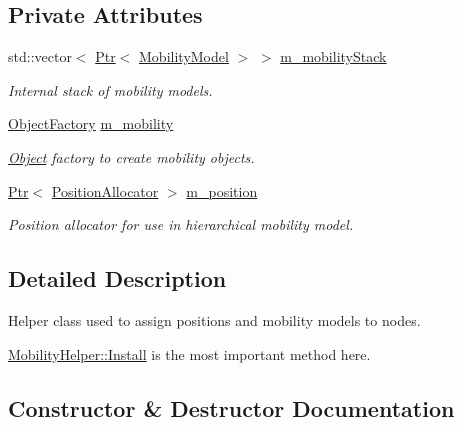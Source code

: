 \subsection*{Private Attributes}
\begin{DoxyCompactItemize}
\item 
std\+::vector$<$ \hyperlink{classns3_1_1Ptr}{Ptr}$<$ \hyperlink{classns3_1_1MobilityModel}{Mobility\+Model} $>$ $>$ \hyperlink{classns3_1_1MobilityHelper_afa6de1206985c5c37610f02de43b10d2}{m\+\_\+mobility\+Stack}
\begin{DoxyCompactList}\small\item\em Internal stack of mobility models. \end{DoxyCompactList}\item 
\hyperlink{classns3_1_1ObjectFactory}{Object\+Factory} \hyperlink{classns3_1_1MobilityHelper_a4ef940485a2e5b840d1552bc5331c404}{m\+\_\+mobility}
\begin{DoxyCompactList}\small\item\em \hyperlink{classns3_1_1Object}{Object} factory to create mobility objects. \end{DoxyCompactList}\item 
\hyperlink{classns3_1_1Ptr}{Ptr}$<$ \hyperlink{classns3_1_1PositionAllocator}{Position\+Allocator} $>$ \hyperlink{classns3_1_1MobilityHelper_a93a974a210f2c818b2649fca2d24d264}{m\+\_\+position}
\begin{DoxyCompactList}\small\item\em Position allocator for use in hierarchical mobility model. \end{DoxyCompactList}\end{DoxyCompactItemize}


\subsection{Detailed Description}
Helper class used to assign positions and mobility models to nodes. 

\hyperlink{classns3_1_1MobilityHelper_a07737960ee95c0777109cf2994dd97ae}{Mobility\+Helper\+::\+Install} is the most important method here. 

\subsection{Constructor \& Destructor Documentation}
